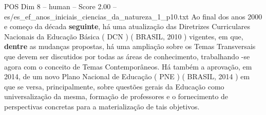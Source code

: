 \begin{textsample}{POS Dim 8 – human – Score 2.00 – es/es\_ef\_anos\_iniciais\_ciencias\_da\_natureza\_1\_p10.txt}  \label{ex:f8_pos_014}
Ao final dos anos 2000 e começo da década \textbf{seguinte}, há uma atualização das Diretrizes Curriculares Nacionais da Educação Básica ( DCN ) ( BRASIL, 2010 ) vigentes, em que, \textbf{dentre} as mudanças propostas, há uma ampliação sobre os Temas Transversais que devem ser discutidos por todas as áreas de conhecimento, trabalhando -se agora com o conceito de Temas Contemporâneos.
Há também a aprovação, em 2014, de um novo Plano Nacional de Educação ( PNE ) ( BRASIL, 2014 ) em que se versa, principalmente, sobre questões gerais da Educação como universalização da mesma, formação de professores e o fornecimento de perspectivas concretas para a materialização de tais objetivos.

\end{textsample}
